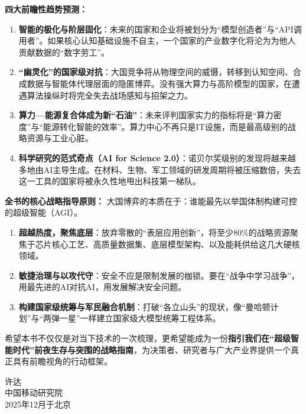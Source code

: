 \textbf{四大前瞻性趋势预测：}
\begin{enumerate}[label=(\arabic*)]
    \item \textbf{智能的极化与阶层固化}：未来的国家和企业将被划分为“模型创造者”与“API调用者”。如果核心认知基础设施不自主，一个国家的产业数字化将沦为为他人贡献数据的“数字劳工”。
    \item \textbf{“幽灵化”的国家级对抗}：大国竞争将从物理空间的威慑，转移到认知空间、合成数据与智能体代理层面的隐匿博弈。没有强大算力与高阶模型的国家，在遭遇算法操纵时将完全失去战场感知与招架之力。
    \item \textbf{算力—能源复合体成为新“石油”}：未来评判国家实力的指标将是“算力密度”与“能源转化智能的效率”。算力中心不再只是IT设施，而是最高级别的战略资源与工业心脏。
    \item \textbf{科学研究的范式奇点（AI for Science 2.0）}：诺贝尔奖级别的发现将越来越多地由AI主导生成。在材料、生物、军工领域的研发周期将被压缩数倍，失去这一工具的国家将被永久性地甩出科技第一梯队。
\end{enumerate}

\textbf{全书的核心战略指导原则：}
大国博弈的本质在于：谁能最先以举国体制构建可控的超级智能（AGI）。
\begin{enumerate}[label=(\arabic*)]
    \item \textbf{超越热度，聚焦底层}：放弃零散的“表层应用创新”，将至少80\%的战略资源聚焦于芯片核心工艺、高质量数据集、底层模型架构、以及能耗供给这几大硬核领域。
    \item \textbf{敏捷治理与以攻代守}：安全不应是限制发展的枷锁。要在“战争中学习战争”，用最先进的AI对抗AI，用发展解决安全问题。
    \item \textbf{构建国家级统筹与军民融合机制}：打破“各立山头”的现状，像“曼哈顿计划”与“两弹一星”一样建立国家级大模型统筹工程体系。
\end{enumerate}

希望本书不仅仅是对当下技术的一次梳理，更希望能成为一份\textbf{指引我们在“超级智能时代”前夜生存与突围的战略指南}，为决策者、研究者与广大产业界提供一个真正具有前瞻视角的行动框架。

\begin{flushright}
许\quad 达\\
中国移动研究院\\
2025年12月于北京
\end{flushright}
